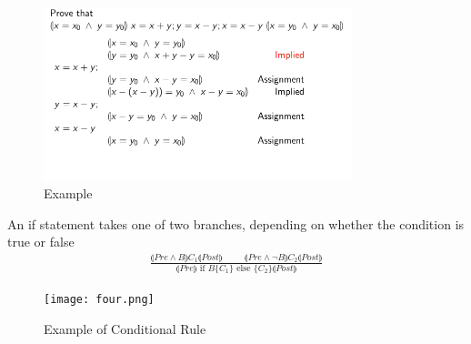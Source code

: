 \documentclass[a4paper]{article}
\theoremstyle{plain}
\theoremstyle{definition}
\newtheorem{defn}{Definition}[section]
\newtheorem{exmp}{Example}[section]
\theoremstyle{remark}
\begin{document}
\begin{tcolorbox}[colback=black!3!white,colframe=black!60!white,title=\begin{exmp}Example \label{Example}\end{exmp}]
        \begin{figure}[H]
        	\centering
        	\includegraphics[width=0.8\textwidth]{three.png}
        	\caption{Example}
        	\label{fig:three-png}
        \end{figure}
\end{tcolorbox}
\begin{tcolorbox}[colback=black!3!white,colframe=black!60!white,title=\begin{defn}Conditional Rule \label{Conditional Rule}\end{defn}]
An if statement takes one of two branches, depending on whether the condition is true or false
\begin{align}
\frac{\llparenthesis Pre \land B \rrparenthesis C_1 \llparenthesis Post \rrparenthesis \;\; \; \; \; \; \; \; \; \llparenthesis Pre \land \neg B \rrparenthesis C_2 \llparenthesis Post \rrparenthesis}{\llparenthesis Pre \rrparenthesis \text{ if } B \{C_1\} \text{ else } \{ C_2 \} \llparenthesis Post \rrparenthesis}
\end{align}
\end{tcolorbox}
\begin{tcolorbox}[colback=black!3!white,colframe=black!60!white,title=\begin{exmp}Example \label{Example}\end{exmp}]
        \begin{figure}[H]
        	\centering
        	\texttt{[image: four.png]}
        	\caption{Example of Conditional Rule}
        	\label{fig:four-png}
        \end{figure}
                \begin{align}
                
                \end{align}
\end{tcolorbox}
\end{document}
